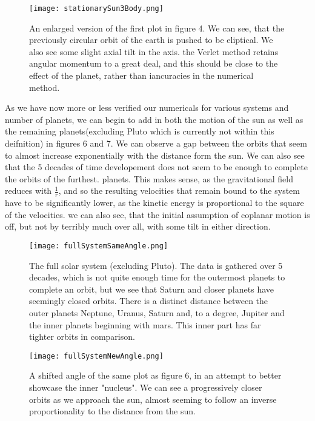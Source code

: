 \documentclass[10pt, twocolumn]{revtex4-1}
\begin{document}
\begin{figure}[hbtp]
    \texttt{[image: stationarySun3Body.png]}
    \caption{An enlarged version of the first plot in figure 4. We can see, that the previously circular orbit of
        the earth is pushed to be eliptical. We also see some slight axial tilt in the axis. the Verlet method retains
        angular momentum to a great deal, and this should be close to the effect of the planet, rather than iancuracies 
        in the numerical method.}
    \label{}
\end{figure}


As we have now more or less verified our numericals for various systems and number of planets, we can begin to add in both the motion 
of the sun as well as the remaining planets(excluding Pluto which is currently not within this deifnition) in figures 6 and 7. We can observe a gap between
the orbits that seem to almost increase exponentially with the distance form the sun. We can also see that the 5 decades of time developement 
does not seem to be enough to complete the orbits of the furthest. planets. This makes sense, as the gravitational field reduces with 
$\frac{1}{r}$, and so the resulting velocities that remain bound to the system have to be significantly lower, as the kinetic energy is 
proportional to the square of the velocities. we can also see, that the initial assumption of coplanar motion is off, but not by terribly 
much over all, with some tilt in either direction. 

\begin{figure}[hbtp]
    \texttt{[image: fullSystemSameAngle.png]}
    \caption{The full solar system (excluding Pluto). The data is gathered over 5 decades, which is not quite enough 
        time for the outermost planets to complete an orbit, but we see that Saturn and closer planets have seemingly 
        closed orbits. There is a distinct distance between the outer planets Neptune, Uranus, Saturn and, to a degree, 
        Jupiter and the inner planets beginning with mars. This inner part has far tighter orbits in comparison.} 
    \label{}
\end{figure}


\begin{figure}[hbtp]
    \texttt{[image: fullSystemNewAngle.png]}
    \caption{A shifted angle of the same plot as figure 6, in an attempt to better showcase the inner "nucleus". 
        We can see a progressively closer orbits as we approach the sun, almost seeming to follow an inverse proportionality 
        to the distance from the sun. } 
    \label{}
\end{figure}
\end{document}
